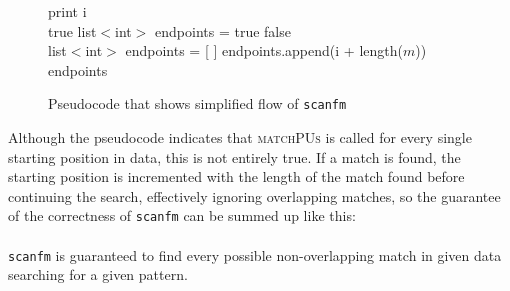\documentclass[12pt]{article}
\newcommand{\sfm}{\texttt{scanfm} }
\begin{document}
\begin{figure}[H]
\begin{center}
\begin{algorithmic}[1]
        \State print i
      \EndIf
    \EndFor
  \EndProcedure \\
  	  \State \Return true
  	\EndIf
    \State list$<$int$>$ endpoints = 
        \State \Return true
      \EndIf
    \EndFor
    \State \Return false
  \EndProcedure \\
    \State list$<$int$>$ endpoints = [ ]
        \State endpoints.append(i + length($m$))
      \EndIf
    \EndFor
    \State \Return endpoints
  \EndProcedure
\end{algorithmic}
\end{center}
\caption{Pseudocode that shows simplified flow of \sfm}
\end{figure}
\noindent Although the pseudocode indicates that \textsc{\small matchPUs} is called for every single starting position
in data, this is not entirely true. If a match is found, the starting position is incremented with the length of 
the match found before continuing the search, effectively ignoring overlapping matches, 
so the guarantee of the correctness of \sfm can be summed up like 
this: \\ \\
\sfm is guaranteed to find every possible non-overlapping match in given data searching for a given pattern.
\end{document}
